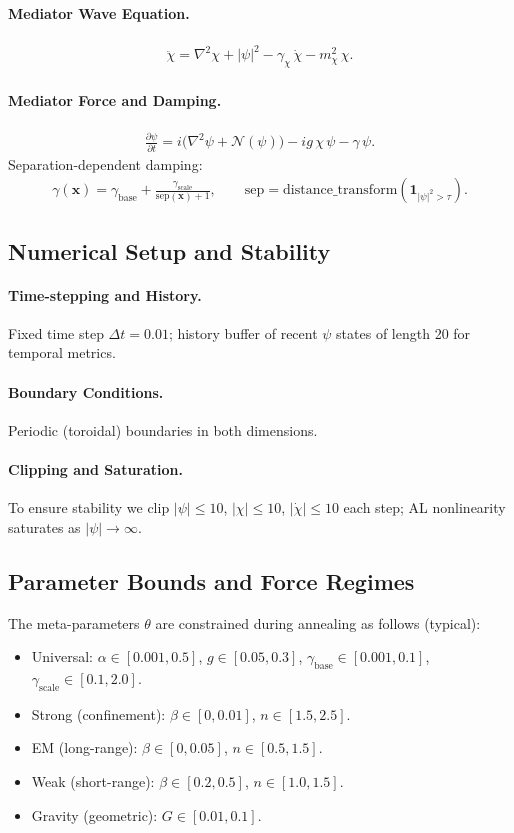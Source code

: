 \documentclass[12pt]{article}
\begin{document}
\paragraph{Mediator Wave Equation.}
\begin{align}
\ddot{\chi} = \nabla^2\chi + |\psi|^2 - \gamma_{\chi}\,\dot{\chi} - m_{\chi}^2\,\chi.
\end{align}
\paragraph{Mediator Force and Damping.}
\begin{align}
\frac{\partial \psi}{\partial t} = i\big(\nabla^2 \psi + \mathcal{N}(\psi)\big) - i g\,\chi\,\psi - \gamma\,\psi.
\end{align}
Separation-dependent damping:
\begin{align}
\gamma(\mathbf{x}) = \gamma_{\mathrm{base}} + \frac{\gamma_{\mathrm{scale}}}{\mathrm{sep}(\mathbf{x})+1},\qquad \mathrm{sep} = \mathrm{distance\_transform}(\mathbf{1}_{|\psi|^2>\tau}).
\end{align}

\subsection{Numerical Setup and Stability}
\paragraph{Time-stepping and History.} Fixed time step $\Delta t=0.01$; history buffer of recent $\psi$ states of length 20 for temporal metrics.
\paragraph{Boundary Conditions.} Periodic (toroidal) boundaries in both dimensions.
\paragraph{Clipping and Saturation.} To ensure stability we clip $|\psi|\le 10$, $|\chi|\le 10$, $|\dot{\chi}|\le 10$ each step; AL nonlinearity saturates as $|\psi|\to\infty$.

\subsection{Parameter Bounds and Force Regimes}
The meta-parameters $\theta$ are constrained during annealing as follows (typical):
\begin{itemize}[leftmargin=1.2em]
  \item Universal: $\alpha\in[0.001,0.5]$, $g\in[0.05,0.3]$, $\gamma_{\mathrm{base}}\in[0.001,0.1]$, $\gamma_{\mathrm{scale}}\in[0.1,2.0]$.
  \item Strong (confinement): $\beta\in[0,0.01]$, $n\in[1.5,2.5]$.
  \item EM (long-range): $\beta\in[0,0.05]$, $n\in[0.5,1.5]$.
  \item Weak (short-range): $\beta\in[0.2,0.5]$, $n\in[1.0,1.5]$.
  \item Gravity (geometric): $G\in[0.01,0.1]$.
\end{itemize}
\end{document}
